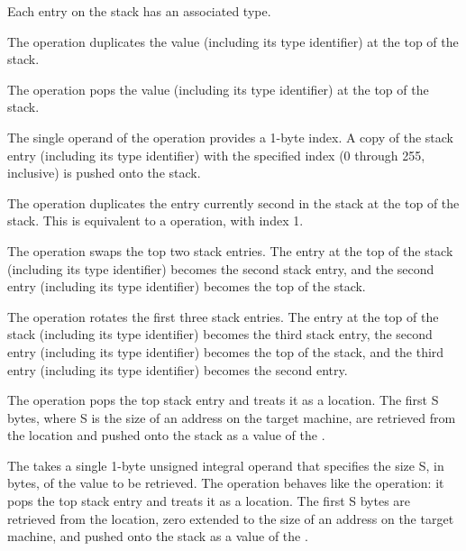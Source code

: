 Each entry on the stack has an associated type.

\begin{enumerate}[1. ]
\itembfnl{\DWOPdupTARG}
The \DWOPdupNAME{} operation duplicates the value (including its
type identifier) at the top of the stack.

\itembfnl{\DWOPdropTARG}
The \DWOPdropNAME{} operation pops the value (including its type
identifier) at the top of the stack.

\itembfnl{\DWOPpickTARG}
The single operand of the \DWOPpickNAME{} operation provides a
1-byte index. A copy of the stack entry (including its
type identifier) with the specified
index (0 through 255, inclusive) is pushed onto the stack.

\itembfnl{\DWOPoverTARG}
The \DWOPoverNAME{} operation duplicates the entry currently second
in the stack at the top of the stack.
This is equivalent to a
\DWOPpick{} operation, with index 1.

\itembfnl{\DWOPswapTARG}
The \DWOPswapNAME{} operation swaps the top two stack entries.
The entry at the top of the stack (including its type identifier)
becomes the second stack entry, and the second entry (including
its type identifier) becomes the top of the stack.

\itembfnl{\DWOProtTARG}
The \DWOProtNAME{} operation rotates the first three stack
entries. The entry at the top of the stack (including its
type identifier) becomes the third stack entry, the second
entry (including its type identifier) becomes the top of
the stack, and the third entry (including its type identifier)
becomes the second entry.

\itembfnl{\DWOPderefTARG}
The \DWOPderefNAME{} operation pops the top stack entry and treats it
as a location. The first S bytes, where S is the size of an address on
the target machine, are retrieved from the location and pushed onto
the stack as a value of the \generictype{}.

\itembfnl{\DWOPderefsizeTARG}

The \DWOPderefsizeNAME{} takes a single 1-byte unsigned integral
operand that specifies the size S, in bytes, of the value to be
retrieved. The operation behaves like the \DWOPderef{} operation: it
pops the top stack entry and treats it as a location. The first S
bytes are retrieved from the location, zero extended to the size of an
address on the target machine, and pushed onto the stack as a value of
the \generictype{}.


\end{enumerate}
